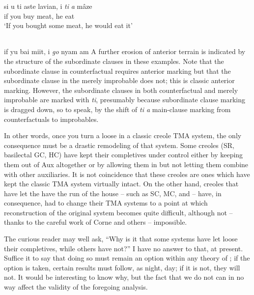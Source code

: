 \ea\label{ex:2:116}
\gll si u ti aste lavian, i \emph{ti} \emph{a} mâze\\
if you {\TNS} buy meat, he {\TNS} {\MOD} eat\\
\glt `If you bought some meat, he would eat it'
\z

\ea\label{ex:2:117}
\ili{\langGC}{}{}\\
if yu bai miit, i \textit{go} nyam am
\z
A further erosion of anterior terrain is indicated by the structure of the subordinate clauses in these examples. Note that the subordinate clause in counterfactual  requires anterior marking but that the subordinate clause in the merely improbable  does not; this is classic anterior marking. However, the subordinate clauses in both counterfactual  and merely improbable  are marked with \textit{ti}, presumably because subordinate clause marking is dragged down, so to speak, by the shift of \textit{ti a} main-clause marking from counterfactuals to improbables.

In other words, once you turn a  loose in a classic creole TMA system, the only consequence must be a drastic remodeling of that system. Some creoles (SR, basilectal GC, HC) have kept their completives under control either by keeping them out of Aux al\-together or by allowing them in but not letting them combine with other auxiliaries. It is not coincidence that these creoles are ones which have kept the classic TMA system virtually intact. On the other hand, creoles that have let the  have the run of the house -- such as SC, MC, and  -- have, in consequence, had to change their TMA systems to a point at which reconstruction of the original system becomes quite difficult, although not -- thanks to the careful work of Corne and others -- impossible.

The curious reader may well ask, ``Why is it that some systems have let loose their completives, while others have not?'' I have no answer to that, at present. Suffice it to say that doing so must remain an option within any theory of ; if the option is taken, certain results must follow, as night, day; if it is not, they will not. It would be interesting to know why, but the fact that we do not can in no way affect the validity of the foregoing analysis.


